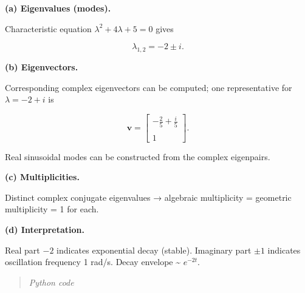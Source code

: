 \documentclass[
  letterpaper,
  DIV=11,
  numbers=noendperiod]{scrreprt}
\begin{document}
\textbf{(a) Eigenvalues (modes).}

Characteristic equation \(\lambda^2 + 4\lambda + 5 = 0\) gives

\[\lambda_{1,2} = -2 \pm i.\]

\textbf{(b) Eigenvectors.}

Corresponding complex eigenvectors can be computed; one representative
for \(\lambda=-2+i\) is

\[\mathbf v = \begin{bmatrix}-\tfrac{2}{5}+\tfrac{i}{5}\\\\[4pt] 1 \end{bmatrix}.\]

Real sinusoidal modes can be constructed from the complex eigenpairs.

\textbf{(c) Multiplicities.}

Distinct complex conjugate eigenvalues → algebraic multiplicity =
geometric multiplicity = 1 for each.

\textbf{(d) Interpretation.}

Real part \(-2\) indicates exponential decay (stable). Imaginary part
\(\pm1\) indicates oscillation frequency 1 rad/s. Decay envelope
\textasciitilde{} \(e^{-2t}\).

\begin{quote}
\emph{Python code}
\end{quote}
\end{document}
